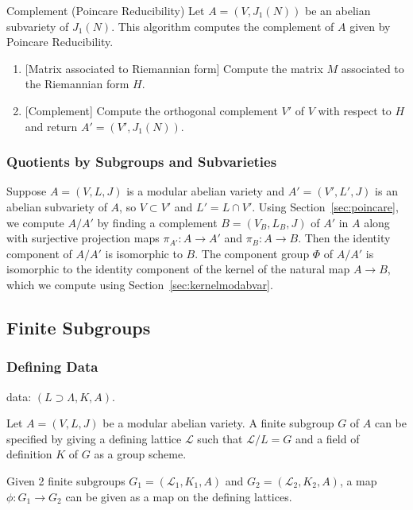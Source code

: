 \documentclass{article}
\begin{document}
\begin{algorithm}{Complement (Poincare Reducibility)}
    Let $A=(V, J_1(N))$ be an abelian subvariety of $J_1(N)$. This algorithm
    computes the complement of $A$ given by Poincare Reducibility.
    \begin{enumerate}
        \item{} [Matrix associated to Riemannian form]
            Compute the matrix $M$ associated to the Riemannian form $H$.
        \item{} [Complement]
            Compute the orthogonal complement $V'$ of $V$ with respect to $H$
            and return $A'=(V', J_1(N))$.
    \end{enumerate}
\end{algorithm}


\subsubsection{Quotients by Subgroups and Subvarieties}


Suppose $A = (V, L, J)$ is a modular abelian variety and $A' = (V',
L', J)$ is an abelian subvariety of $A$, so $V\subset V'$ and $L' =
L\cap V'$.  Using Section~\ref{sec:poincare}, we compute $A/A'$ by
finding a complement $B=(V_B,L_B,J)$ of $A'$ in $A$ along with
surjective projection maps $\pi_{A'}: A \to A'$ and $\pi_B: A\to B$.
Then the identity component of $A/A'$ is isomorphic to $B$.  The
component group $\Phi$ of $A/A'$ is isomorphic to the identity
component of the kernel of the natural map $A \to B$, which we compute
using Section~\ref{sec:kernelmodabvar}.

\subsection{Finite Subgroups}


\subsubsection{Defining Data}


data: $(L\supset \Lambda, K, A)$.

Let $A=(V, L, J)$ be a modular abelian variety. A finite subgroup $G$ of $A$
can be specified by giving a defining lattice $\mathcal{L}$ such that
$\mathcal{L}/L = G$ and a field of definition $K$ of $G$ as a group scheme. 

Given 2 finite subgroups $G_1=(\mathcal{L}_1, K_1, A)$ and $G_2=(\mathcal{L}_2,
K_2, A)$, a map $\phi: G_1\to G_2$ can be given as a map on the defining
lattices.
\end{document}
